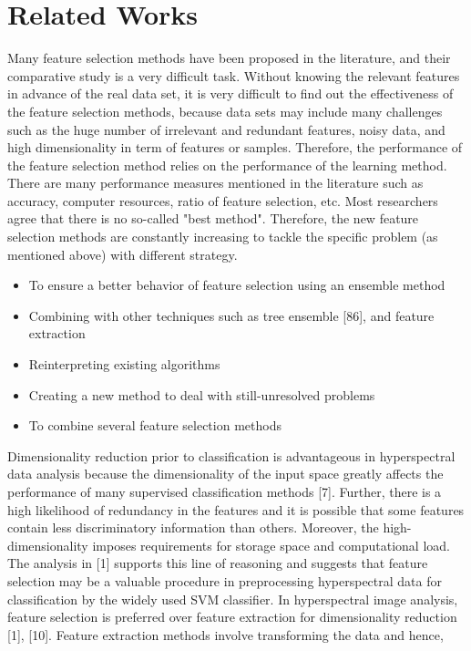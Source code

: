 \documentclass[document.tex]{subfiles}
\begin{document}
\section{Related Works}
\noindent Many feature selection methods have been proposed in the literature, and their comparative study is a very difficult task. Without knowing the relevant features in advance of
the real data set, it is very difficult to find out the effectiveness of the feature selection
methods, because data sets may include many challenges such as the huge number of irrelevant and redundant features, noisy data, and high dimensionality in term of features
or samples. Therefore, the performance of the feature selection method relies on the performance of the learning method. There are many performance measures mentioned in
the literature such as accuracy, computer resources, ratio of feature selection, etc. Most
researchers agree that there is no so-called "best method". Therefore, the new feature
selection methods are constantly increasing to tackle the specific problem (as mentioned
above) with different strategy.
\begin{itemize}
	\item To ensure a better behavior of feature selection using an ensemble method
	\item Combining with other techniques such as tree ensemble [86], and feature extraction
	\item Reinterpreting existing algorithms
	\item Creating a new method to deal with still-unresolved problems
	\item To combine several feature selection methods
\end{itemize}
Dimensionality reduction prior to classification is advantageous in hyperspectral data
analysis because the dimensionality of the input space greatly affects the performance of
many supervised classification methods [7]. Further, there is a high likelihood of redundancy in the features and it is possible that some features contain less discriminatory
information than others. Moreover, the high-dimensionality imposes requirements for
storage space and computational load. The analysis in [1] supports this line of reasoning
and suggests that feature selection may be a valuable procedure in preprocessing hyperspectral data for classification by the widely used SVM classifier. In hyperspectral
image analysis, feature selection is preferred over feature extraction for dimensionality
reduction [1], [10]. Feature extraction methods involve transforming the data and hence,
\end{document}
